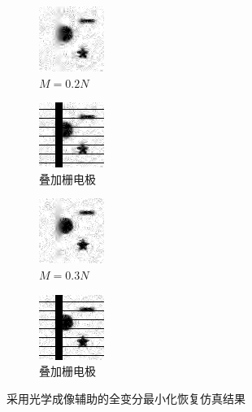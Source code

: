 \begin{figure}
\centering
\begin{subfigure}[h]{1.1in}
\includegraphics{Figure/L1/opt2.png}
\caption{$M = 0.2N$}
\end{subfigure}
\begin{subfigure}[h]{1.1in}
\includegraphics{Figure/L1/opt2f.png}
\caption{叠加栅电极}
\end{subfigure}
\begin{subfigure}[h]{1.1in}
\includegraphics{Figure/L1/opt3.png}
\caption{$M = 0.3N$}
\end{subfigure}
\begin{subfigure}[h]{1.1in}
\includegraphics{Figure/L1/opt3f.png}
\caption{叠加栅电极}
\end{subfigure}
\caption{采用光学成像辅助的全变分最小化恢复仿真结果}
\label{fig:optl1}
\end{figure}
